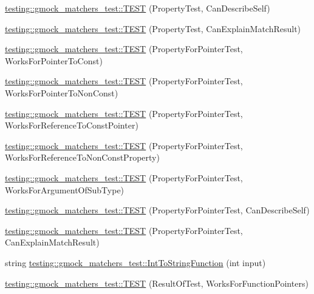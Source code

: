 \begin{DoxyCompactItemize}
\item 
\hyperlink{namespacetesting_1_1gmock__matchers__test_a8c749e210723e33547e58fe8822fb85e}{testing\+::gmock\+\_\+matchers\+\_\+test\+::\+T\+E\+ST} (Property\+Test, Can\+Describe\+Self)
\item 
\hyperlink{namespacetesting_1_1gmock__matchers__test_aff810d2cdd79c55d483965a28bb5069a}{testing\+::gmock\+\_\+matchers\+\_\+test\+::\+T\+E\+ST} (Property\+Test, Can\+Explain\+Match\+Result)
\item 
\hyperlink{namespacetesting_1_1gmock__matchers__test_ac9222439b8e0b1e080650d667044c140}{testing\+::gmock\+\_\+matchers\+\_\+test\+::\+T\+E\+ST} (Property\+For\+Pointer\+Test, Works\+For\+Pointer\+To\+Const)
\item 
\hyperlink{namespacetesting_1_1gmock__matchers__test_acc639f3cbeacf4af712bf02ac451b160}{testing\+::gmock\+\_\+matchers\+\_\+test\+::\+T\+E\+ST} (Property\+For\+Pointer\+Test, Works\+For\+Pointer\+To\+Non\+Const)
\item 
\hyperlink{namespacetesting_1_1gmock__matchers__test_a028687dfb04ec008ea129f9cc95aac62}{testing\+::gmock\+\_\+matchers\+\_\+test\+::\+T\+E\+ST} (Property\+For\+Pointer\+Test, Works\+For\+Reference\+To\+Const\+Pointer)
\item 
\hyperlink{namespacetesting_1_1gmock__matchers__test_a78762b60c9d0c985916b698e6d4c55e3}{testing\+::gmock\+\_\+matchers\+\_\+test\+::\+T\+E\+ST} (Property\+For\+Pointer\+Test, Works\+For\+Reference\+To\+Non\+Const\+Property)
\item 
\hyperlink{namespacetesting_1_1gmock__matchers__test_a4c2f4b483550e2e70b09eea3836b83e0}{testing\+::gmock\+\_\+matchers\+\_\+test\+::\+T\+E\+ST} (Property\+For\+Pointer\+Test, Works\+For\+Argument\+Of\+Sub\+Type)
\item 
\hyperlink{namespacetesting_1_1gmock__matchers__test_a064fc5dd5ca0106e8ed0fbc483472186}{testing\+::gmock\+\_\+matchers\+\_\+test\+::\+T\+E\+ST} (Property\+For\+Pointer\+Test, Can\+Describe\+Self)
\item 
\hyperlink{namespacetesting_1_1gmock__matchers__test_a1a7e2a9641a06e492d58c75d900330d3}{testing\+::gmock\+\_\+matchers\+\_\+test\+::\+T\+E\+ST} (Property\+For\+Pointer\+Test, Can\+Explain\+Match\+Result)
\item 
string \hyperlink{namespacetesting_1_1gmock__matchers__test_a2399c4fae49f898c02f57a42047d80f2}{testing\+::gmock\+\_\+matchers\+\_\+test\+::\+Int\+To\+String\+Function} (int input)
\item 
\hyperlink{namespacetesting_1_1gmock__matchers__test_a5aea17c7d3dd74cbc0cbf181b3a9e5f8}{testing\+::gmock\+\_\+matchers\+\_\+test\+::\+T\+E\+ST} (Result\+Of\+Test, Works\+For\+Function\+Pointers)

\end{DoxyCompactItemize}
